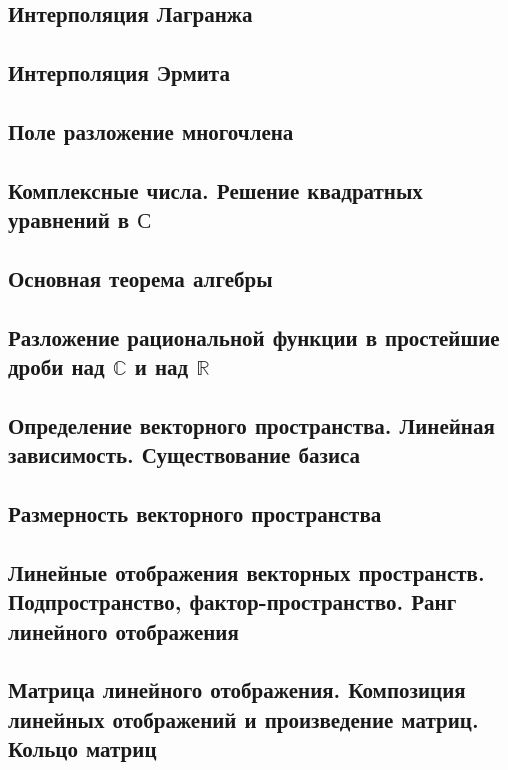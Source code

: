 \documentclass[a4paper,100pt]{article}
\theoremstyle{indented}
\theoremstyle{definition}
\theoremstyle{remark}
\begin{document}
\subsection{Интерполяция Лагранжа}

\subsection{Интерполяция Эрмита}

\subsection{Поле разложение многочлена}

\subsection{Комплексные числа. Решение квадратных уравнений в $\mathbb{С}$}

\subsection{Основная теорема алгебры}

\subsection{Разложение рациональной функции в простейшие дроби над $\mathbb{C}$ и над $\mathbb{R}$}

\subsection{Определение векторного пространства. Линейная зависимость. Существование базиса}

\subsection{Размерность векторного пространства}

\subsection{Линейные отображения векторных пространств. Подпространство, фактор-пространство. Ранг линейного отображения}

\subsection{Матрица линейного отображения. Композиция линейных отображений и произведение матриц. Кольцо матриц}
\end{document}
